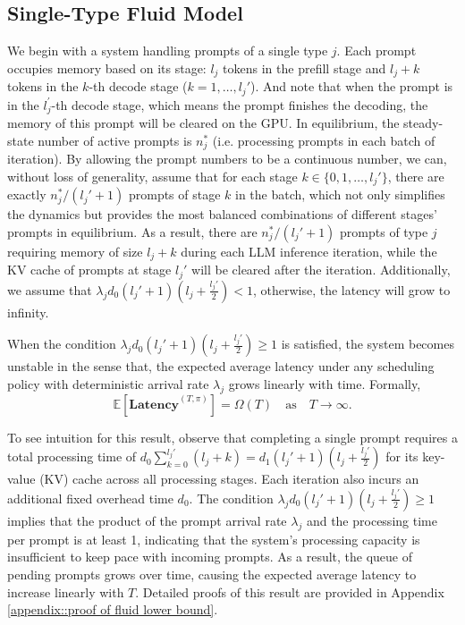 \subsection{Single-Type Fluid Model}
We begin with a system handling prompts of a single type \(j\). Each prompt occupies memory based on its stage: \(l_j\) tokens in the prefill stage and \(l_j + k\) tokens in the \(k\)-th decode stage (\(k = 1, \dots, l_j'\)). And note that when the prompt is in the $l_j^\prime$-th decode stage, which means the prompt finishes the decoding, the memory of this prompt will be cleared on the GPU. In equilibrium, the steady-state number of active prompts is \(n_j^*\) (i.e. processing prompts in each batch of iteration). By allowing the prompt numbers to be a continuous number, we can, without loss of generality, assume that for each stage $k\in\{0,1,\dots,l_j'\}$, 
there are exactly $n_j^*/(l_j'+1)$ prompts of stage $k$ in the batch, which not only simplifies the dynamics but provides the most balanced combinations of different stages' prompts in equilibrium. As a result, there are $n_j^*/(l_j'+1)$ prompts of type $j$ requiring memory of size $l_j+k$ during each LLM inference iteration, while the KV cache of prompts at stage $l_j'$ will be cleared after the iteration.  Additionally, we assume that $\lambda_j d_0 (l_j' + 1) \left( l_j + \frac{l_j'}{2} \right) <1$, otherwise, the latency will grow to infinity.
\begin{proposition}\label{prop:large_rate}
When the condition  $
\lambda_j d_0 (l_j' + 1) \left( l_j + \frac{l_j'}{2} \right) \geq 1
$
is satisfied, the system becomes unstable in the sense that, the expected average latency under any scheduling policy with deterministic arrival rate \( \lambda_j \) grows linearly with time. Formally,  
$$
\mathbb{E}[\textbf{Latency}^{(T,\pi)}] = \Omega(T) \quad \text{as} \quad T \to \infty.
$$
\end{proposition}
To see intuition for this result, observe that completing a single prompt requires a total processing time of \(d_0 \sum_{k=0}^{l_j'} (l_j + k) = d_1 (l_j' + 1) \left( l_j + \frac{l_j'}{2} \right)\) for its key-value (KV) cache across all processing stages. Each iteration also incurs an additional fixed overhead time \(d_0\). The condition \(\lambda_j d_0 (l_j' + 1) \left( l_j + \frac{l_j'}{2} \right) \geq 1\) implies that the product of the prompt arrival rate \(\lambda_j\) and the processing time per prompt is at least 1, indicating that the system’s processing capacity is insufficient to keep pace with incoming prompts. As a result, the queue of pending prompts grows over time, causing the expected average latency to increase linearly with \(T\). Detailed proofs of this result are provided in Appendix \ref{appendix::proof of fluid lower bound}.

